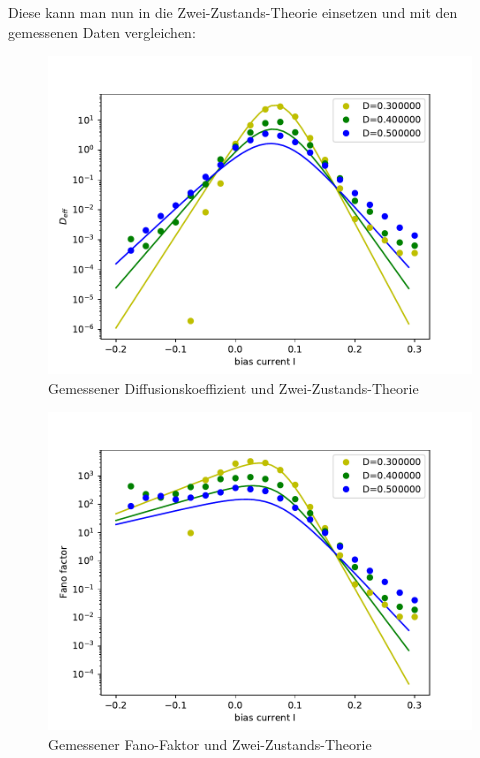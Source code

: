 \documentclass[12pt,a4paper]{article}
\begin{document}
Diese kann man nun in die Zwei-Zustands-Theorie einsetzen und mit den gemessenen Daten vergleichen:
\begin{figure}[H]
	\centering
	\includegraphics[scale=0.9]{dcompdfrealfast6jjem2.pdf}
	\caption{Gemessener Diffusionskoeffizient und Zwei-Zustands-Theorie}
	\label{deff2st}
\end{figure}
\begin{figure}[H]
	\centering
	\includegraphics[scale=0.9]{fcompdfrealfast6jjem2.pdf}
	\caption{Gemessener Fano-Faktor und Zwei-Zustands-Theorie}
	\label{fano2st}
\end{figure}
\end{document}
